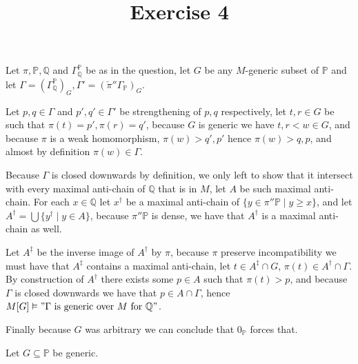 

\usepackage{skak}
\usepackage{relsize}
\usepackage{graphicx}
\usepackage{mathtools}

\usepackage{textcomp}
\usepackage{bbding}

\usepackage{soul}



\title{Exercise 4}

\maketitle
\begin{cExercise}
	\begin{cPart}
		Let $\pi,\mathbb P, \mathbb Q$ and $\Gamma_\mathbb Q^\mathbb P$ be as in the question, let $G$ be any $M$-generic subset of $\mathbb P$ and let $\Gamma=(\Gamma_\mathbb Q^\mathbb P)_G, \Gamma'=(\check\pi''\Gamma_\mathbb P)_G$.
		
		Let $p,q\in\Gamma$ and $p',q'\in\Gamma'$ be strengthening of $p,q$ respectively, let $t,r\in G$ be such that $\pi(t)=p',\pi(r)=q'$, because $G$ is generic we have $t,r<w\in G$, and because $\pi$ is a weak homomorphism, $\pi(w)>q',p'$ hence $\pi(w)>q,p$, and almost by definition $\pi(w)\in \Gamma$.
		
		Because $\Gamma$ is closed downwards by definition, we only left to show that it intersect with every maximal anti-chain of $\mathbb Q$ that is in $M$, let $A$ be such maximal anti-chain. For each $x\in\mathbb Q$ let $x^\dagger$ be a maximal anti-chain of $\{y\in \pi''\mathbb P\mid y\ge x\}$, and let $A^\dagger=\bigcup\{y^\dagger\mid y\in A\}$, because $\pi''\mathbb P$ is dense, we have that $A^\dagger$ is a maximal anti-chain as well.
		
		Let $A^\ddagger$ be the inverse image of $A^\dagger$ by $\pi$, because $\pi$ preserve incompatibility we must have that $A^\ddagger$ contains a maximal anti-chain, let $t\in A^\ddagger\cap G$, $\pi(t)\in A^\dagger\cap \Gamma$. By construction of $A^\dagger$ there exists some $p\in A$ such that $\pi(t)>p$, and because $\Gamma$ is closed downwards we have that $p\in A\cap \Gamma$, hence $M[G]\vDash"\Gamma\text{ is generic over $M$ for $\mathbb Q$}"$.
		
		Finally because $G$ was arbitrary we can conclude that $0_\mathbb P$ forces that.
	\end{cPart}
	\begin{cPart}
		Let $G\subseteq \mathbb P$ be generic.
		

\end{cPart}
\end{cExercise}
